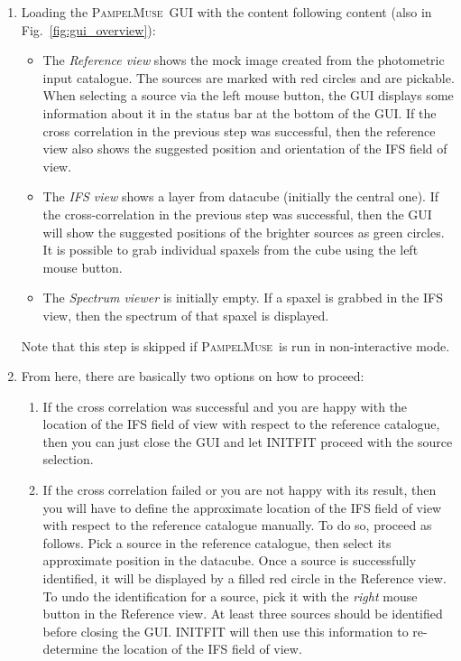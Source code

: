 \documentclass[a4paper,10pt]{article}
\newcommand{\pampelmuse}{\textsc{PampelMuse}\ }
\begin{document}
\begin{enumerate}
 \item Loading the \pampelmuse GUI with the content following content (also in Fig.~\ref{fig:gui_overview}):
  \begin{itemize}
   \item The \textit{Reference view} shows the mock image created from the photometric input catalogue. The sources are marked with red circles and are pickable. When selecting a source via the left mouse button, the GUI displays some information about it in the status bar at the bottom of the GUI. If the cross correlation in the previous step was successful, then the reference view also shows the suggested position and orientation of the IFS field of view.
   \item The \textit{IFS view} shows a layer from datacube (initially the central one). If the cross-correlation in the previous step  was successful, then the GUI will show the suggested positions of the brighter sources as green circles. It is possible to grab individual spaxels from the cube using the left mouse button.
   \item The \textit{Spectrum viewer} is initially empty. If a spaxel is grabbed in the IFS view, then the spectrum of that spaxel is displayed.
  \end{itemize}
  Note that  this step is skipped if \pampelmuse is run in non-interactive mode.
 \item From here, there are basically two options on how to proceed:
  \begin{enumerate}
   \item If the cross correlation was successful and you are happy with the location of the IFS field of view with respect to the reference catalogue, then you can just close the GUI and let INITFIT proceed with the source selection.
   \item If the cross correlation failed or you are not happy with its result, then you will have to define the approximate location of the IFS field of view with respect to the reference catalogue manually. To do so, proceed as follows. Pick a source in the reference catalogue, then select its approximate position in the datacube. Once a source is successfully identified, it will be displayed by a filled red circle in the Reference view. To undo the identification for a source, pick it with the \textit{right} mouse button in the Reference view. At least three sources should be identified before closing the GUI. INITFIT will then use this information to re-determine the location of the IFS field of view.
  \end{enumerate}

\end{enumerate}
\end{document}

